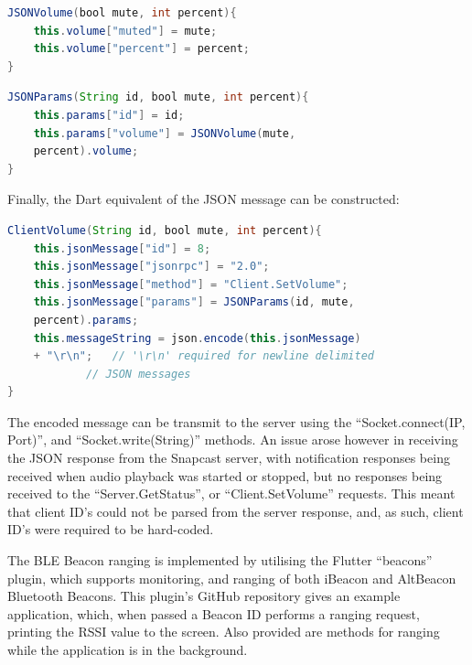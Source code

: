 \documentclass[11pt,a4paper,headinclude=false,footinclude=false]{scrreprt}
\begin{document}
\begin{lstlisting}[language=Java]
JSONVolume(bool mute, int percent){
    this.volume["muted"] = mute;
    this.volume["percent"] = percent;
}
\end{lstlisting}

\lstset{
    caption=Dart JSON "params" Field Constructor,
    basicstyle=\footnotesize, frame=tb,
    xleftmargin=.2\textwidth, xrightmargin=.2\textwidth
}

\begin{lstlisting}[language=Java]
JSONParams(String id, bool mute, int percent){
    this.params["id"] = id;
    this.params["volume"] = JSONVolume(mute,
    percent).volume;
}
\end{lstlisting}

Finally, the Dart equivalent of the JSON message can be constructed:

\lstset{
    caption=Dart JSON Client.SetVolume Constructor,
    basicstyle=\footnotesize, frame=tb,
    xleftmargin=.2\textwidth, xrightmargin=.2\textwidth
}

\begin{lstlisting}[language=Java]
ClientVolume(String id, bool mute, int percent){
    this.jsonMessage["id"] = 8;
    this.jsonMessage["jsonrpc"] = "2.0";
    this.jsonMessage["method"] = "Client.SetVolume";
    this.jsonMessage["params"] = JSONParams(id, mute,
    percent).params;
    this.messageString = json.encode(this.jsonMessage)
    + "\r\n";   // '\r\n' required for newline delimited
            // JSON messages
}
\end{lstlisting}

The encoded message can be transmit to the server using the
``Socket.connect(IP, Port)'', and ``Socket.write(String)'' methods. An
issue arose however in receiving the JSON response from the Snapcast
server, with notification responses being received when audio playback
was started or stopped, but no responses being received to the
``Server.GetStatus'', or ``Client.SetVolume'' requests. This meant that
client ID's could not be parsed from the server response, and, as such,
client ID's were required to be hard-coded.

The BLE Beacon ranging is implemented by utilising the Flutter
``beacons'' plugin, which supports monitoring, and ranging of both
iBeacon and AltBeacon Bluetooth Beacons\cite{flutterBeacons}. This
plugin's GitHub repository gives an example application, which, when
passed a Beacon ID performs a ranging request, printing the RSSI value
to the screen. Also provided are methods for ranging while the
application is in the background.
\end{document}
